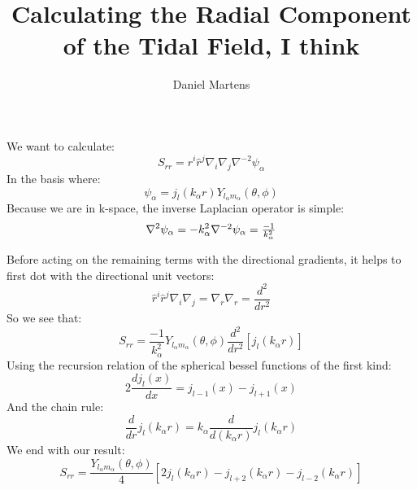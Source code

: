 \documentclass[11pt, oneside]{article}   	%
\title{Calculating the Radial Component of the Tidal Field, I think}
\author{Daniel Martens}
\begin{document}
\maketitle


We want to calculate:
\begin{equation}
S_{r r} = \hat{r}^{i} \hat{r}^{j} \nabla_{i} \nabla_{j} \nabla^{-2} \psi_{\alpha}
\end{equation}
In the basis where:
\begin{equation}
\psi_{\alpha} = j_{l}(k_{\alpha}r) Y_{l_{\alpha}m_{\alpha}}(\theta,\phi)
\end{equation}
Because we are in k-space, the inverse Laplacian operator is simple:
\begin{equation}
\nabla^{2}\psi_{\alpha} = -k_{\alpha}^{2}
$$
$$
\nabla^{-2}\psi_{\alpha} = \frac{-1}{k_{\alpha}^{2}}
\end{equation}

Before acting on the remaining terms with the directional gradients, it helps to first dot with the directional unit vectors:
\begin{equation}
\hat{r}^{i} \hat{r}^{j} \nabla_{i} \nabla_{j} = \nabla_{r} \nabla_{r} = \frac{d^{2}}{dr^{2}}
\end{equation}
So we see that:
\begin{equation}
S_{rr} = \frac{-1}{k_{\alpha}^{2}} Y_{l_{\alpha}m_{\alpha}}(\theta,\phi) \frac{d^{2}}{dr^{2}} \left[j_{l}(k_{\alpha}r)  \right]
\end{equation}
Using the recursion relation of the spherical bessel functions of the first kind:
\begin{equation}
2 \frac{dj_{l}(x)}{dx} = j_{l-1}(x) - j_{l+1}(x)
\end{equation}
And the chain rule:
\begin{equation}
\frac{d}{dr}j_{l}(k_{\alpha}r) = k_{\alpha} \frac{d}{d(k_{\alpha}r)} j_{l}(k_{\alpha}r)
\end{equation}
We end with our result:
\begin{equation}
S_{r r} = \frac{Y_{l_{\alpha}m_{\alpha}}(\theta,\phi)}{4}\left[ 2 j_{l}(k_{\alpha}r) - j_{l+2}(k_{\alpha}r) - j_{l-2}(k_{\alpha}r) \right]
\end{equation}
\end{document}

